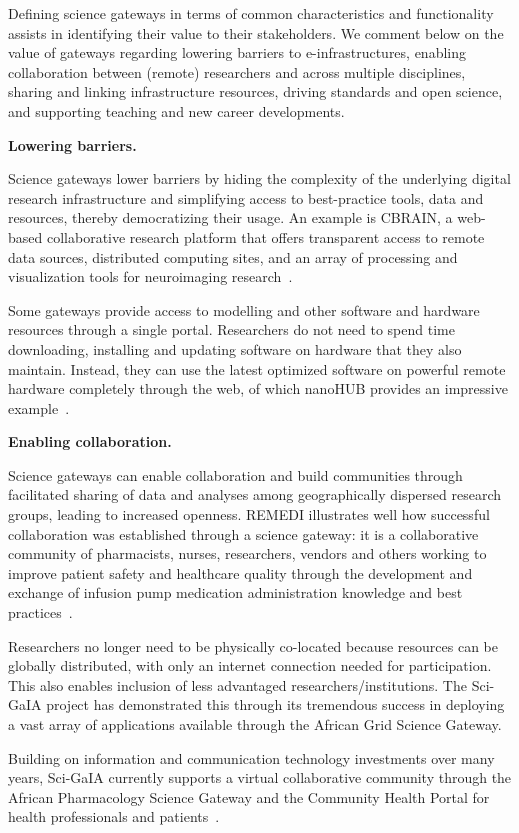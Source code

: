 \documentclass[review]{elsarticle}
\newcommand{\changedtext}[1]{
	{#1}
}
\begin{document}
\changedtext{Defining science gateways in terms of common characteristics and functionality assists in identifying their value to their stakeholders. We comment below on the value of gateways regarding lowering barriers to e-infrastructures, enabling collaboration between (remote) researchers and across multiple disciplines, sharing and linking infrastructure resources, driving standards and open science, and supporting teaching and new career developments.  }


\changedtext{\textbf{Lowering barriers.}}
Science gateways lower barriers by hiding the complexity of the underlying digital research infrastructure and simplifying access to best-practice tools, data and resources, thereby democratizing their usage. 
An example is CBRAIN, a web-based collaborative research platform that offers transparent access to remote data sources, distributed computing sites, and an array of processing and visualization tools for neuroimaging research~\cite{cbrain-70}. 

Some  gateways provide access to  modelling and other software and hardware resources through a single portal. Researchers do not need to spend time downloading, installing and updating software on hardware that they also maintain. 
Instead, they can use the latest optimized software on powerful remote hardware completely through the web, of which nanoHUB provides an impressive example~\cite{nanohub-33}. 

\changedtext{\textbf{Enabling collaboration.}}
Science gateways can enable collaboration and build communities through facilitated sharing of data and analyses among geographically dispersed research groups, leading to increased openness. REMEDI illustrates well  how successful collaboration was established through a science gateway: it is a collaborative community of pharmacists, nurses, researchers, vendors and others working to improve patient safety and healthcare quality through the development and exchange of infusion pump medication administration knowledge and best practices~\cite{remedi-71}.  

Researchers no longer need to be physically co-located because resources can be globally distributed, with only an internet connection needed for participation. This also enables inclusion of less advantaged researchers/institutions. 
The Sci-GaIA project has demonstrated this through its tremendous success in deploying a vast array of applications available through the African Grid Science Gateway. 
\changedtext{Building on information and communication technology investments over many years, Sci-GaIA currently supports a virtual collaborative community through the African Pharmacology Science Gateway and the Community Health Portal for health professionals and patients~\cite{sci-gaia-22}. }
\end{document}
